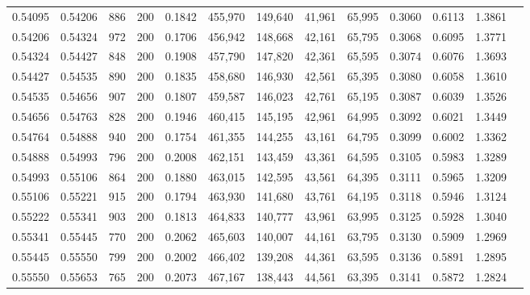 \begin{tabular}{rrrrrrrrrrrrr}
0.54095 & 0.54206 &    886 & 200 &                                     0.1842 & 455,970 & 149,640 &  41,961 &  65,995 & 0.3060 & 0.6113 & 1.3861 \\
0.54206 & 0.54324 &    972 & 200 &                                     0.1706 & 456,942 & 148,668 &  42,161 &  65,795 & 0.3068 & 0.6095 & 1.3771 \\
0.54324 & 0.54427 &    848 & 200 &                                     0.1908 & 457,790 & 147,820 &  42,361 &  65,595 & 0.3074 & 0.6076 & 1.3693 \\
0.54427 & 0.54535 &    890 & 200 &                                     0.1835 & 458,680 & 146,930 &  42,561 &  65,395 & 0.3080 & 0.6058 & 1.3610 \\
0.54535 & 0.54656 &    907 & 200 &                                     0.1807 & 459,587 & 146,023 &  42,761 &  65,195 & 0.3087 & 0.6039 & 1.3526 \\
0.54656 & 0.54763 &    828 & 200 &                                     0.1946 & 460,415 & 145,195 &  42,961 &  64,995 & 0.3092 & 0.6021 & 1.3449 \\
0.54764 & 0.54888 &    940 & 200 &                                     0.1754 & 461,355 & 144,255 &  43,161 &  64,795 & 0.3099 & 0.6002 & 1.3362 \\
0.54888 & 0.54993 &    796 & 200 &                                     0.2008 & 462,151 & 143,459 &  43,361 &  64,595 & 0.3105 & 0.5983 & 1.3289 \\
0.54993 & 0.55106 &    864 & 200 &                                     0.1880 & 463,015 & 142,595 &  43,561 &  64,395 & 0.3111 & 0.5965 & 1.3209 \\
0.55106 & 0.55221 &    915 & 200 &                                     0.1794 & 463,930 & 141,680 &  43,761 &  64,195 & 0.3118 & 0.5946 & 1.3124 \\
0.55222 & 0.55341 &    903 & 200 &                                     0.1813 & 464,833 & 140,777 &  43,961 &  63,995 & 0.3125 & 0.5928 & 1.3040 \\
0.55341 & 0.55445 &    770 & 200 &                                     0.2062 & 465,603 & 140,007 &  44,161 &  63,795 & 0.3130 & 0.5909 & 1.2969 \\
0.55445 & 0.55550 &    799 & 200 &                                     0.2002 & 466,402 & 139,208 &  44,361 &  63,595 & 0.3136 & 0.5891 & 1.2895 \\
0.55550 & 0.55653 &    765 & 200 &                                     0.2073 & 467,167 & 138,443 &  44,561 &  63,395 & 0.3141 & 0.5872 & 1.2824 \\

\end{tabular}
